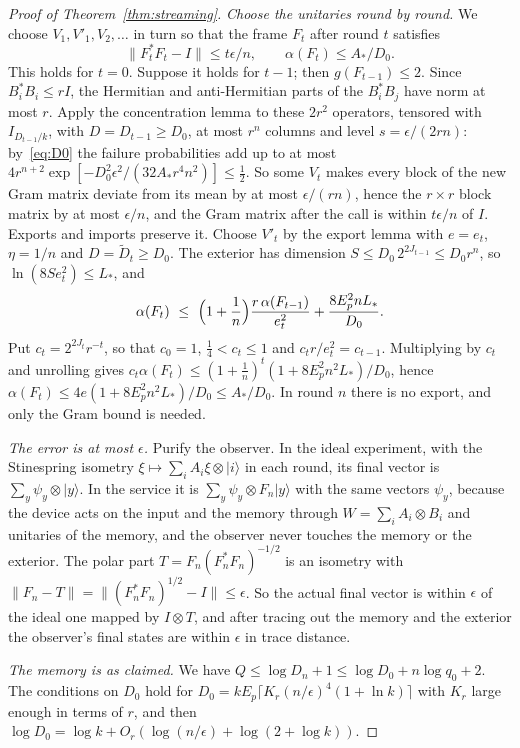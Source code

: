 \begin{proof}[Proof of Theorem~\ref{thm:streaming}]
\emph{Choose the unitaries round by round.} We choose $V_1,V'_1,V_2,\dots$ in turn so that the frame $F_t$ after round $t$ satisfies
\begin{equation}\label{eq:streaming-induction}
\|F_t^*F_t-I\|\le t\epsilon/n,\qquad \alpha(F_t)\le A_*/D_0 .
\end{equation}
This holds for $t=0$. Suppose it holds for $t-1$; then $g(F_{t-1})\le2$. Since $B_i^*B_i\le rI$, the Hermitian and anti-Hermitian parts of the $B_i^*B_j$
have norm at most $r$. Apply the concentration lemma to these $2r^2$ operators, tensored with $I_{D_{t-1}/k}$, with $D=D_{t-1}\ge D_0$, at most $r^n$
columns and level $s=\epsilon/(2rn)$: by~\eqref{eq:D0} the failure probabilities add up to at most
$4r^{n+2}\exp[-D_0^2\epsilon^2/(32A_*r^4n^2)]\le\frac12$. So some $V_t$ makes every block of the new Gram matrix deviate from its mean by at most
$\epsilon/(rn)$, hence the $r\times r$ block matrix by at most $\epsilon/n$, and the Gram matrix after the call is within $t\epsilon/n$ of $I$. Exports and
imports preserve it. Choose $V'_t$ by the export lemma with $e=e_t$, $\eta=1/n$ and $D=\widetilde D_t\ge D_0$. The exterior has dimension
$S\le D_0\,2^{2J_{t-1}}\le D_0r^n$, so $\ln(8Se_t^2)\le L_*$, and
\[
\alpha(F_t)\ \le\ \Bigl(1+\frac1n\Bigr)\frac{r\,\alpha(F_{t-1})}{e_t^2}+\frac{8E_p^2nL_*}{D_0}.
\]
Put $c_t=2^{2J_t}r^{-t}$, so that $c_0=1$, $\frac14<c_t\le1$ and $c_tr/e_t^2=c_{t-1}$. Multiplying by $c_t$ and unrolling gives
$c_t\alpha(F_t)\le(1+\frac1n)^t(1+8E_p^2n^2L_*)/D_0$, hence $\alpha(F_t)\le4e(1+8E_p^2n^2L_*)/D_0\le A_*/D_0$. In round $n$ there is no export, and only the
Gram bound is needed.

\emph{The error is at most $\epsilon$.} Purify the observer. In the ideal experiment, with the Stinespring isometry
$\xi\mapsto\sum_iA_i\xi\otimes|i\rangle$ in each round, its final vector is $\sum_y\psi_y\otimes|y\rangle$. In the service it is
$\sum_y\psi_y\otimes F_n|y\rangle$ with the same vectors $\psi_y$, because the device acts on the input and the memory through
$W=\sum_iA_i\otimes B_i$ and unitaries of the memory, and the observer never touches the memory or the exterior. The polar part
$T=F_n(F_n^*F_n)^{-1/2}$ is an isometry with $\|F_n-T\|=\|(F_n^*F_n)^{1/2}-I\|\le\epsilon$. So the actual final vector is within $\epsilon$ of the
ideal one mapped by $I\otimes T$, and after tracing out the memory and the exterior the observer's final states are within $\epsilon$ in trace
distance.

\emph{The memory is as claimed.} We have $Q\le\log D_n+1\le\log D_0+n\log q_0+2$. The conditions on $D_0$ hold for
$D_0=kE_p\lceil K_r(n/\epsilon)^4(1+\ln k)\rceil$ with $K_r$ large enough in terms of $r$, and then
$\log D_0=\log k+O_r(\log(n/\epsilon)+\log(2+\log k))$.
\end{proof}
